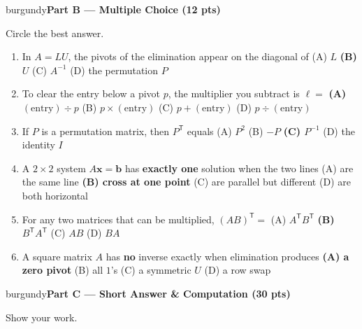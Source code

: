 \documentclass[10pt]{article}
\newcommand{\bb}{\mathbf{b}}
\newcommand{\xx}{\mathbf{x}}
\newcommand{\parthead}[1]{%
  \vspace{6pt}\noindent
  \begin{headlinebox}{burgundy}{\color{white}\bfseries #1}\end{headlinebox}%
  \vspace{4pt}}
\begin{document}
\parthead{Part B --- Multiple Choice (12 pts)}
Circle the best answer.

\begin{enumerate}[leftmargin=1.9em, itemsep=9pt]
  \item In $A=LU$, the pivots of the elimination appear on the diagonal of
    \hfill (A) $L$ \quad \textbf{(B) $U$} \ans{$\leftarrow$} \quad (C) $A^{-1}$ \quad (D) the permutation $P$
  \item To clear the entry below a pivot $p$, the multiplier you subtract is $\ell=$
    \hfill \textbf{(A) $(\text{entry})\div p$} \ans{$\leftarrow$} \quad (B) $p\times(\text{entry})$ \quad (C) $p+(\text{entry})$ \quad (D) $p\div(\text{entry})$
  \item If $P$ is a permutation matrix, then $P^{\mathsf T}$ equals
    \hfill (A) $P^2$ \quad (B) $-P$ \quad \textbf{(C) $P^{-1}$} \ans{$\leftarrow$} \quad (D) the identity $I$
  \item A $2\times2$ system $A\xx=\bb$ has \textbf{exactly one} solution when the two lines
    \hfill (A) are the same line \quad \textbf{(B) cross at one point} \ans{$\leftarrow$} \quad (C) are parallel but different \quad (D) are both horizontal
  \item For any two matrices that can be multiplied, $(AB)^{\mathsf T}=$
    \hfill (A) $A^{\mathsf T}B^{\mathsf T}$ \quad \textbf{(B) $B^{\mathsf T}A^{\mathsf T}$} \ans{$\leftarrow$} \quad (C) $AB$ \quad (D) $BA$
  \item A square matrix $A$ has \textbf{no} inverse exactly when elimination produces
    \hfill \textbf{(A) a zero pivot} \ans{$\leftarrow$} \quad (B) all $1$'s \quad (C) a symmetric $U$ \quad (D) a row swap
\end{enumerate}

\boxguard[12]
\parthead{Part C --- Short Answer \& Computation (30 pts)}
Show your work.
\end{document}
